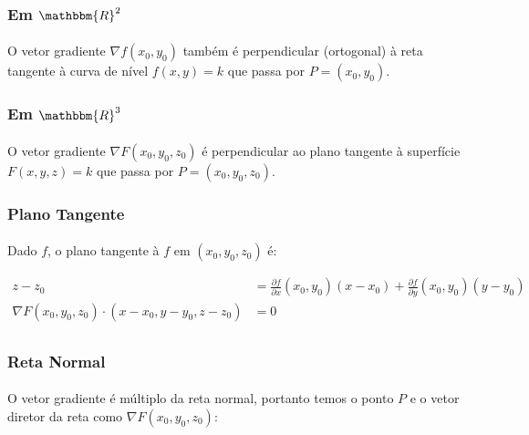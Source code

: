 \documentclass{article}
\newcommand{\PartialDer}[2] {\frac{\partial #1} {\partial #2}}
\begin{document}
            \subsubsection{Em $\mathbbm{R}^2$}
                \paragraph{}
                O vetor gradiente $\nabla f(x_0, y_0)$ também é perpendicular (ortogonal) à reta tangente à curva de nível $f(x, y) = k$
                que passa por $P = (x_0, y_0)$.

            \subsubsection{Em $\mathbbm{R}^3$}
                \paragraph{}
                O vetor gradiente $\nabla F(x_0, y_0, z_0)$ é perpendicular ao plano tangente à superfície $F(x, y, z) = k$ que passa
                por $P = (x_0, y_0, z_0)$.

            \subsubsection{Plano Tangente}
                \paragraph{}
                Dado $f$, o plano tangente à $f$ em $(x_0, y_0, z_0)$ é:

                \begin{align*}
                    z - z_0 &= \PartialDer{f}{x}(x_0, y_0) (x - x_0) + \PartialDer{f}{y}(x_0, y_0) (y - y_0)\\
                    \nabla F(x_0, y_0, z_0) \cdot (x - x_0, y - y_0, z - z_0) &= 0\\
                \end{align*}

            \subsubsection{Reta Normal}
                \paragraph{}
                O vetor gradiente é múltiplo da reta normal, portanto temos o ponto $P$ e o vetor diretor da reta como
                $\nabla F(x_0, y_0, z_0)$:
\end{document}
